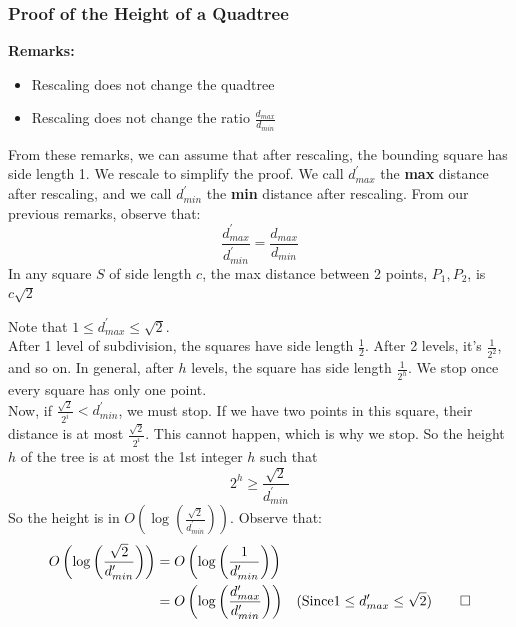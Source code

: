 \documentclass{report}
\begin{document}
\subsubsection{Proof of the Height of a Quadtree}
\textbf{Remarks:}
\begin{itemize}
\item Rescaling does not change the quadtree
\item Rescaling does not change the ratio $\frac{d_{max}}{d_{min}}$
\end{itemize}
From these remarks, we can assume that after rescaling, the bounding square has side length 1. We rescale to simplify the proof.
We call $d_{max}^\prime$ the \textbf{max} distance after rescaling, and we call $d_{min}^\prime$ the \textbf{min} distance after rescaling. From our previous remarks, observe that:
$$\frac{d_{max}^\prime}{d_{min}^\prime} = \frac{d_{max}}{d_{min}}$$
In any square $S$ of side length $c$, the max distance between 2 points, $P_1,P_2$, is $c\sqrt{2}$
\begin{center}
\end{center}
Note that $1 \leq d_{max}^\prime \leq \sqrt{2}$.\\After 1 level of subdivision, the squares have side length $\displaystyle\frac{1}{2}$. After 2 levels, it's $\displaystyle\frac{1}{2^2}$, and so on. In general, after $h$ levels, the square has side length $\displaystyle\frac{1}{2^h}$.
We stop once every square has only one point.
\\ Now, if $\displaystyle\frac{\sqrt{2}}{2^i} < d_{min}^\prime$, we must stop. If we have two points in this square, their distance is at most $\displaystyle\frac{\sqrt{2}}{2^i}$. This cannot happen, which is why we stop. So the height $h$ of the tree is at most the 1st integer $h$ such that
$$2^h \geq \frac{\sqrt{2}}{d_{min}^\prime}$$
So the height is in $O\left(\log\left(\displaystyle \frac{\sqrt{2}}{d_{min}^\prime}\right)\right)$. Observe that:
\begin{align*}
O\left(\log\left(\displaystyle \frac{\sqrt{2}}{d_{min}^\prime}\right)\right) &= O\left(\log\left(\displaystyle \frac{1}{d_{min}^\prime}\right)\right) \\
&= O\left(\log\left(\displaystyle \frac{d_{max}^\prime}{d_{min}^\prime}\right)\right) & (\text{Since} 1 \leq d_{max}^\prime \leq \sqrt{2}) \qed
\end{align*}
\end{document}
